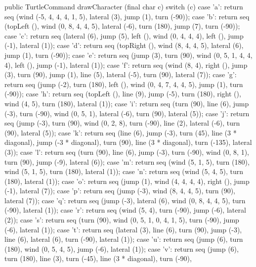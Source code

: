 \documentclass{report}
\begin{document}
\begin{javacode}
{  public TurtleCommand drawCharacter (final char c) {
    switch (c) {
      case 'a': return seq (wind (-5, 4, 4, 4, 1, 5), lateral (3), jump (1), turn (-90));
      case 'b': return seq (topLeft (), wind (0, 8, 4, 4, 5), lateral (-6), turn (180), jump (7), turn (-90));
      case 'c': return seq (lateral (6), jump (5), left (), wind (0, 4, 4, 4), left (), jump (-1), lateral (1));
      case 'd': return seq (topRight (), wind (8, 4, 4, 5), lateral (6), jump (1), turn (-90));
      case 'e': return seq (jump (3), turn (90), wind (0, 5, 1, 4, 4, 4), left (), jump (-1), lateral (1));
      case 'f': return seq (wind (8, 4), right (), jump (3), turn (90), jump (1), line (5), lateral (-5), turn (90),
                            lateral (7));
      case 'g': return seq (jump (-2), turn (180), left (), wind (0, 4, 7, 4, 4, 5), jump (1), turn (-90));
      case 'h': return seq (topLeft (), line (9), jump (-5), turn (180), right (), wind (4, 5), turn (180),
                            lateral (1));
      case 'i': return seq (turn (90), line (6), jump (-3), turn (-90), wind (0, 5, 1), lateral (-6), turn (90),
                            lateral (5));
      case 'j': return seq (jump (-3), turn (90), wind (0, 2, 8), turn (-90), line (2), lateral (-6), turn (90),
                            lateral (5));
      case 'k': return seq (line (6), jump (-3), turn (45), line (3 * diagonal), jump (-3 * diagonal), turn (90),
                            line (3 * diagonal), turn (-135), lateral (3));
      case 'l': return seq (turn (90), line (6), jump (-3), turn (-90), wind (0, 8, 1), turn (90), jump (-9),
                            lateral (6));
      case 'm': return seq (wind (5, 1, 5), turn (180), wind (5, 1, 5), turn (180), lateral (1));
      case 'n': return seq (wind (5, 4, 5), turn (180), lateral (1));
      case 'o': return seq (jump (1), wind (4, 4, 4, 4), right (), jump (-1), lateral (7));
      case 'p': return seq (jump (-3), wind (8, 4, 4, 5), turn (90), lateral (7));
      case 'q': return seq (jump (-3), lateral (6), wind (0, 8, 4, 4, 5), turn (-90), lateral (1));
      case 'r': return seq (wind (5, 4), turn (-90), jump (-6), lateral (2));
      case 's': return seq (turn (90), wind (0, 5, 1, 0, 4, 1, 5), turn (-90), jump (-6), lateral (1));
      case 't': return seq (lateral (3), line (6), turn (90), jump (-3), line (6), lateral (6),
                            turn (-90), lateral (1));
      case 'u': return seq (jump (6), turn (180), wind (0, 5, 4, 5), jump (-6), lateral (1));
      case 'v': return seq (jump (6), turn (180), line (3), turn (-45), line (3 * diagonal), turn (-90),
}}}
\end{javacode}
\end{document}
